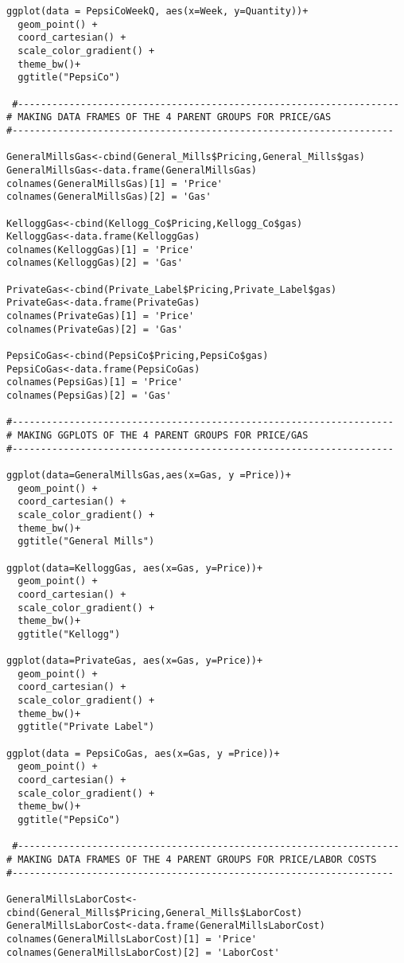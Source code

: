 \documentclass[12pt,english]{article}
\begin{document}
\begin{lstlisting}
ggplot(data = PepsiCoWeekQ, aes(x=Week, y=Quantity))+
  geom_point() +
  coord_cartesian() +
  scale_color_gradient() +
  theme_bw()+
  ggtitle("PepsiCo")
  
 #-------------------------------------------------------------------
# MAKING DATA FRAMES OF THE 4 PARENT GROUPS FOR PRICE/GAS
#-------------------------------------------------------------------

GeneralMillsGas<-cbind(General_Mills$Pricing,General_Mills$gas)
GeneralMillsGas<-data.frame(GeneralMillsGas)
colnames(GeneralMillsGas)[1] = 'Price'
colnames(GeneralMillsGas)[2] = 'Gas'

KelloggGas<-cbind(Kellogg_Co$Pricing,Kellogg_Co$gas)
KelloggGas<-data.frame(KelloggGas)
colnames(KelloggGas)[1] = 'Price'
colnames(KelloggGas)[2] = 'Gas'

PrivateGas<-cbind(Private_Label$Pricing,Private_Label$gas)
PrivateGas<-data.frame(PrivateGas)
colnames(PrivateGas)[1] = 'Price'
colnames(PrivateGas)[2] = 'Gas'

PepsiCoGas<-cbind(PepsiCo$Pricing,PepsiCo$gas)
PepsiCoGas<-data.frame(PepsiCoGas)
colnames(PepsiGas)[1] = 'Price'
colnames(PepsiGas)[2] = 'Gas'

#-------------------------------------------------------------------
# MAKING GGPLOTS OF THE 4 PARENT GROUPS FOR PRICE/GAS
#-------------------------------------------------------------------

ggplot(data=GeneralMillsGas,aes(x=Gas, y =Price))+
  geom_point() +
  coord_cartesian() +
  scale_color_gradient() +
  theme_bw()+
  ggtitle("General Mills")

ggplot(data=KelloggGas, aes(x=Gas, y=Price))+
  geom_point() +
  coord_cartesian() +
  scale_color_gradient() +
  theme_bw()+
  ggtitle("Kellogg")

ggplot(data=PrivateGas, aes(x=Gas, y=Price))+
  geom_point() +
  coord_cartesian() +
  scale_color_gradient() +
  theme_bw()+
  ggtitle("Private Label")

ggplot(data = PepsiCoGas, aes(x=Gas, y =Price))+
  geom_point() +
  coord_cartesian() +
  scale_color_gradient() +
  theme_bw()+
  ggtitle("PepsiCo")
  
 #-------------------------------------------------------------------
# MAKING DATA FRAMES OF THE 4 PARENT GROUPS FOR PRICE/LABOR COSTS
#-------------------------------------------------------------------

GeneralMillsLaborCost<-cbind(General_Mills$Pricing,General_Mills$LaborCost)
GeneralMillsLaborCost<-data.frame(GeneralMillsLaborCost)
colnames(GeneralMillsLaborCost)[1] = 'Price'
colnames(GeneralMillsLaborCost)[2] = 'LaborCost'


\end{lstlisting}
\end{document}
